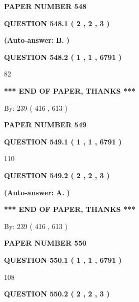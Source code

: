 \documentclass{ctexart}
\begin{document}
   
\newpage 
\setcounter{page}{ 
   548001 } 
   
   
 {\textbf{ \Large{ PAPER NUMBER  548  }}}
   
   
   
   
  
  
{\textbf{\large{QUESTION
548.1 
 ( 2 , 2 , 3 )
}}}
 
 
{\textbf{(Auto-answer:}}
{\textbf{\large{
B.}}}
{\textbf{)}}
 
 
  
  
{\textbf{\large{QUESTION
548.2 
 ( 1 , 1 , 6791 )
}}}

82
   
   
   
   
\vspace{1.0in} 
{\textbf{\large{ *** END OF PAPER, THANKS *** }}} 
   
   
\hspace{1.0in} By: 
 239 ( 416 ,  613 )
   
   
   
   
\newpage 
\setcounter{page}{ 
   549001 } 
   
   
 {\textbf{ \Large{ PAPER NUMBER  549  }}}
   
   
   
   
  
  
{\textbf{\large{QUESTION
549.1 
 ( 1 , 1 , 6791 )
}}}

110
  
  
{\textbf{\large{QUESTION
549.2 
 ( 2 , 2 , 3 )
}}}
 
 
{\textbf{(Auto-answer:}}
{\textbf{\large{
A.}}}
{\textbf{)}}
 
 
   
   
   
   
\vspace{1.0in} 
{\textbf{\large{ *** END OF PAPER, THANKS *** }}} 
   
   
\hspace{1.0in} By: 
 239 ( 416 ,  613 )
   
   
   
   
\newpage 
\setcounter{page}{ 
   550001 } 
   
   
 {\textbf{ \Large{ PAPER NUMBER  550  }}}
   
   
   
   
  
  
{\textbf{\large{QUESTION
550.1 
 ( 1 , 1 , 6791 )
}}}

108
  
  
{\textbf{\large{QUESTION
550.2 
 ( 2 , 2 , 3 )
}}}
 
\end{document}

